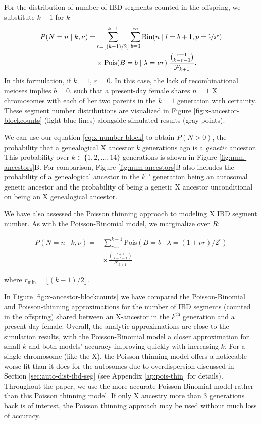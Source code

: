 \documentclass[9pt,twocolumn,twoside]{gsajnl}
\begin{document}
For the distribution of number of IBD segments counted in the offspring, we
substitute $k-1$ for $k$
\begin{align}
  P(N=n \;|\; k, \nu) =& \sum_{r=\lfloor (k-1)/2 \rfloor}^{k-1} \sum_{b=0}^\infty \text{Bin}(n \;|\; l=b+1, p=\nicefrac{1}{2^r}) \\ \nonumber & \times \text{Pois}(B=b \;|\; \lambda=\nu r) \; \frac{{r+1 \choose k-r-1}}{\mathcal{F}_{k+1}}.
  \label{eq:x-number-block}
\end{align}
%
In this formulation, if $k=1$, $r = 0$. In this case, the lack of
recombinational meioses implies $b=0$, such that a present-day female shares
$n=1$ X chromosomes with each of her two parents in the $k=1$ generation with
certainty. These segment number distributions are visualized in Figure
\ref{fig:x-ancestor-blockcounts} (light blue lines) alongside simulated results
(gray points).

We can use our equation \eqref{eq:x-number-block} to obtain $P(N > 0)$, the
probability that a genealogical X ancestor $k$ generations ago is a
\emph{genetic} ancestor. This probability over $k \in \{1, 2, \ldots, 14\}$
generations is shown in Figure \ref{fig:num-ancestors}B. For comparison, Figure
\ref{fig:num-ancestors}B also includes the probability of a genealogical
ancestor in the $k^\text{th}$ generation being an autosomal genetic ancestor
and the probability of being a genetic X ancestor unconditional on being an X
genealogical ancestor. 

We have also assessed the Poisson thinning approach to modeling X IBD segment
number. As with the Poisson-Binomial model, we marginalize over $R$:

\begin{align}
  P(N=n \;|\; k, \nu) =& \sum_{r_\text{min}}^{k-1} 
  \text{Pois}(B=b \;|\; \lambda=(1 + \nu r)/2^r) 
  \\ \nonumber &\times \frac{{r+1 \choose k-r-1}}{\mathcal{F}_{k+1}}
  \label{eq:x-number-block-thinned}
\end{align}

where $r_\text{min} = \lfloor (k-1)/2 \rfloor$.

In Figure \ref{fig:x-ancestor-blockcounts} we have compared the
Poisson-Binomial and Poisson-thinning approximations for the number of IBD
segments (counted in the offspring) shared between an X-ancestor in the
$k^\text{th}$ generation and a present-day female. Overall, the analytic
approximations are close to the simulation results, with the Poisson-Binomial
model a closer approximation for small $k$ and both models' accuracy improving
quickly with increasing $k$.  For a single chromosome (like the X), the
Poisson-thinning model offers a noticeable worse fit than it does for the
autosomes due to overdispersion discussed in Section
\ref{sec:auto-dist-ibd-seg} (see Appendix \ref{ap:pois-thin} for details).
Throughout the paper, we use the more accurate Poisson-Binomial model rather
than this Poisson thinning model. If only X ancestry more than 3 generations
back is of interest, the Poisson thinning approach may be used without much
loss of accuracy.
\end{document}
